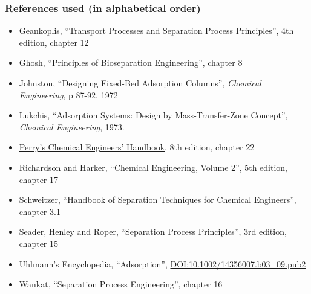\begin{frame}\frametitle{References used (in alphabetical order)}
	\begin{itemize}
		\item	Geankoplis, ``Transport Processes and Separation Process Principles'', 4th edition, chapter 12
		\item	Ghosh, ``Principles of Bioseparation Engineering'', chapter 8
		\item	Johnston, ``Designing Fixed-Bed Adsorption Columns'', \emph{Chemical Engineering}, p 87-92, 1972
		\item	Lukchis, ``Adsorption Systems: Design by Mass-Transfer-Zone Concept'', \emph{Chemical Engineering}, 1973.
		\item	\href{http://accessengineeringlibrary.com/browse/perrys-chemical-engineers-handbook-eighth-edition}{Perry's Chemical Engineers' Handbook}, 8th edition, chapter 22
		\item	Richardson and Harker, ``Chemical Engineering, Volume 2'', 5th edition, chapter 17
		\item	Schweitzer, ``Handbook of Separation Techniques for Chemical Engineers'', chapter 3.1
		\item	Seader, Henley and Roper, ``Separation Process Principles'', 3rd edition, chapter 15
		\item	Uhlmann's Encyclopedia, ``Adsorption'', {\tiny \href{http://dx.doi.org/10.1002/14356007.b03\_09.pub2}{DOI:10.1002/14356007.b03\_09.pub2}}
		\item	Wankat, ``Separation Process Engineering'', chapter 16
	\end{itemize}
\end{frame}


